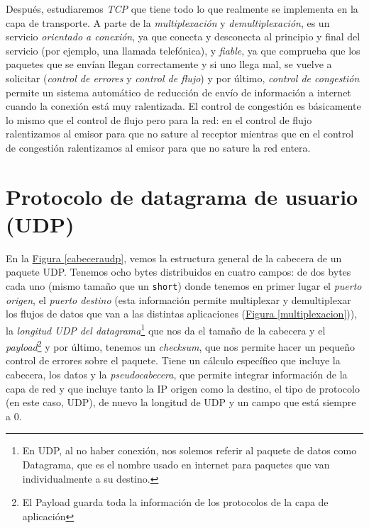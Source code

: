 \documentclass[10pt,a4paper,spanish]{report}
\begin{document}
Después, estudiaremos \textcolor{tema3}{\textit{TCP}} que tiene todo lo que realmente se implementa en la capa de transporte. A parte de la \textcolor{tema3}{\textit{multiplexación}} y \textcolor{tema3}{\textit{demultiplexación}}, es un servicio \textcolor{tema3}{\textit{orientado a conexión}}, ya que conecta y desconecta al principio y final del servicio (por ejemplo, una llamada telefónica), y \textcolor{tema3}{\textit{fiable}}, ya que comprueba que los paquetes que se envían llegan correctamente y si uno llega mal, se vuelve a solicitar (\textcolor{tema3}{\textit{control de errores}} y \textcolor{tema3}{\textit{control de flujo}}) y por último, \textcolor{tema3}{\textit{control de congestión}} permite un sistema automático de reducción de envío de información a internet cuando la conexión está muy ralentizada. El control de congestión es básicamente lo mismo que el control de flujo pero para la red: en el control de flujo ralentizamos al emisor para que no sature al receptor mientras que en el control de congestión ralentizamos al emisor para que no sature la red entera.

\section{\textcolor{tema3}Protocolo de datagrama de usuario (UDP)}
En la \hyperref[cabeceraudp]{Figura \ref*{cabeceraudp}}, vemos la estructura general de la cabecera de un paquete UDP. Tenemos ocho bytes distribuidos en cuatro campos: de dos bytes cada uno (mismo tamaño que un \texttt{short}) donde tenemos en primer lugar el \textit{\textcolor{tema3}{puerto origen}}, el \textcolor{tema3}{\textit{puerto destino}} (esta información permite multiplexar y demultiplexar los flujos de datos que van a las distintas aplicaciones (\hyperref[multiplexacion]{Figura \ref*{multiplexacion}})), la \textcolor{tema3}{\textit{longitud UDP del datagrama}}\footnote{En UDP, al no haber conexión, nos solemos referir al paquete de datos como Datagrama, que es el nombre usado en internet para paquetes que van individualmente a su destino.} que nos da el tamaño de la cabecera y el \textcolor{tema3}{\textit{payload}}\footnote{El Payload guarda toda la información de los protocolos de la capa de aplicación} y por último, tenemos un \textcolor{tema3}{\textit{checksum}}, que nos permite hacer un pequeño control de errores sobre el paquete. Tiene un cálculo específico que incluye la cabecera, los datos y la \textit{\textcolor{tema3}{pseudocabecera}}, que permite integrar información de la capa de red y que incluye tanto la IP origen como la destino, el tipo de protocolo (en este caso, UDP), de nuevo la longitud de UDP y un campo que está siempre a 0.
\end{document}
